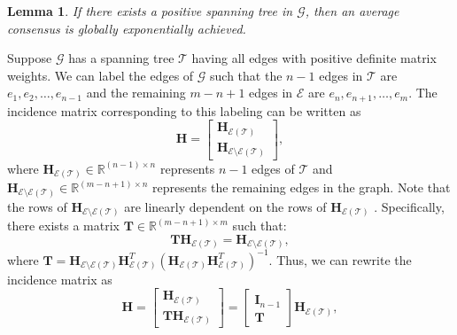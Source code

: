 \documentclass[draftclsnofoot,11pt,onecolumn]{IEEEtran}
\newtheorem{Lemma}{Lemma}
\newcommand{\m}[1]{\mathbf{#1}}
\newcommand{\mc}[1]{\mathcal{#1}}
\newcommand{\mb}[1]{\mathbb{#1}}
\begin{document}
\begin{Lemma} \label{lem:pos_span_tree}
If there exists a positive spanning tree in $\mc{G}$, then an average consensus is globally exponentially achieved.
\end{Lemma}

\begin{IEEEproof}
Suppose $\mc{G}$ has a spanning tree $\mc{T}$ having all edges with positive definite matrix weights. We can label the edges of $\mc{G}$ such that the $n-1$ edges in $\mc{T}$ are $e_1, e_2, \ldots, e_{n-1}$ and the remaining $m-n+1$ edges in $\mc{E}$ are $e_{n}, e_{n+1}, \ldots, e_m$. The incidence matrix corresponding to this labeling can be written as
\begin{equation*}
\m{H} = \begin{bmatrix}
\m{H}_{\mc{E}(\mc{T})} \\
\m{H}_{\mc{E}\setminus \mc{E}(\mc{T})}
\end{bmatrix},
\end{equation*}
where $\m{H}_{\mc{E}(\mc{T})} \in \mb{R}^{(n-1)\times n}$ represents $n-1$ edges of $\mc{T}$ and $\m{H}_{\mc{E}\setminus \mc{E}(\mc{T})}
\in \mb{R}^{(m-n+1)\times n}$ represents the remaining edges in the graph. Note that the rows of $\m{H}_{\mc{E}\setminus \mc{E}(\mc{T})}
$ are linearly dependent on the rows of $\m{H}_{\mc{E}(\mc{T})}$ \cite{Zelazo2011tac}. Specifically, there exists a matrix $\m{T} \in \mb{R}^{(m-n+1) \times m}$ such that:
$$ \m{T} \m{H}_{\mc{E}(\mc{T})} =\m{H}_{\mc{E}\setminus \mc{E}(\mc{T})},$$
where 
$ \m{T} = \m{H}_{\mc{E}\setminus \mc{E}(\mc{T})} \m{H}_{\mc{E}(\mc{T})}^T (\m{H}_{\mc{E}(\mc{T})}\m{H}_{\mc{E}(\mc{T})}^T)^{-1}.$ 
Thus, we can rewrite the incidence matrix as
\begin{equation}
\m{H} = \begin{bmatrix}
\m{H}_{\mc{E}(\mc{T})} \\
\m{T} \m{H}_{\mc{E}(\mc{T})}
\end{bmatrix} = \begin{bmatrix}
\m{I}_{n-1} \\
\m{T} 
\end{bmatrix} \m{H}_{\mc{E}(\mc{T})},
\end{equation}

\end{IEEEproof}
\end{document}
